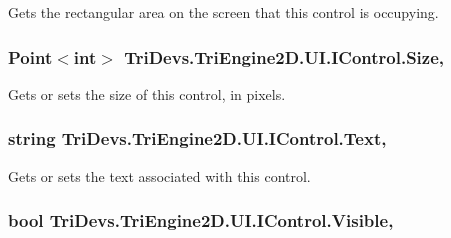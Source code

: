 Gets the rectangular area on the screen that this control is occupying. 

\hypertarget{interface_tri_devs_1_1_tri_engine2_d_1_1_u_i_1_1_i_control_afc66d577eebbce35df396621c881334c}{
\subsubsection[{Size}]{\setlength{\rightskip}{0pt plus 5cm}Point$<$int$>$ Tri\-Devs.\-Tri\-Engine2\-D.\-U\-I.\-I\-Control.\-Size\hspace{0.3cm}{\ttfamily [get]}, {\ttfamily [set]}}}\label{interface_tri_devs_1_1_tri_engine2_d_1_1_u_i_1_1_i_control_afc66d577eebbce35df396621c881334c}


Gets or sets the size of this control, in pixels. 

\hypertarget{interface_tri_devs_1_1_tri_engine2_d_1_1_u_i_1_1_i_control_a4d46268068ed2824a1ad78be6b3a9ebb}{
\subsubsection[{Text}]{\setlength{\rightskip}{0pt plus 5cm}string Tri\-Devs.\-Tri\-Engine2\-D.\-U\-I.\-I\-Control.\-Text\hspace{0.3cm}{\ttfamily [get]}, {\ttfamily [set]}}}\label{interface_tri_devs_1_1_tri_engine2_d_1_1_u_i_1_1_i_control_a4d46268068ed2824a1ad78be6b3a9ebb}


Gets or sets the text associated with this control. 

\hypertarget{interface_tri_devs_1_1_tri_engine2_d_1_1_u_i_1_1_i_control_ac0217db5d8c9b8ee6e226df157aceac6}{
\subsubsection[{Visible}]{\setlength{\rightskip}{0pt plus 5cm}bool Tri\-Devs.\-Tri\-Engine2\-D.\-U\-I.\-I\-Control.\-Visible\hspace{0.3cm}{\ttfamily [get]}, {\ttfamily [set]}}}\label{interface_tri_devs_1_1_tri_engine2_d_1_1_u_i_1_1_i_control_ac0217db5d8c9b8ee6e226df157aceac6}


